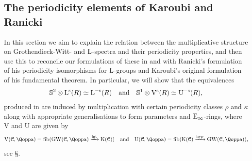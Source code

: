 



















 








\subsection{The periodicity elements of Karoubi and Ranicki}
\label{subsection:PeriodicityviaMultiplication}%


In this section we aim to explain the relation between the multiplicative structure on Grothendieck-Witt- and $\operatorname L$-spectra and their periodicity properties, and then use this to reconcile our formulations of these in \paperone and \papertwo with Ranicki's formulation of his periodicity isomorphisms for $\operatorname L$-groups and Karoubi's original formulation of his fundamental theorem. In particular, we will show that the equivalences
\[
\mathbb S^2 \otimes \operatorname L^{\mathrm{s}}(R) \simeq \operatorname L^{-\mathrm{s}}(R) \quad \text{and} \quad \mathbb S^1 \otimes \mathrm V^{\mathrm{s}}(R) \simeq \mathrm U^{-\mathrm{s}}(R),
\]
produced in \papertwo are induced by multiplication with certain periodicity classes $\rho$ and $\kappa$ along with appropriate generalisations to form parameters and ${\mathrm{E}_{\infty}}$-rings, where %
$\mathrm V$ and $\mathrm U$ are given by
\[
\mathrm V(\C,\QF) = \fib(\GW(\C,\QF) \xrightarrow{\fgt} \K(\C))  \quad \text{and} \quad \mathrm U(\C,\QF) = \fib(\K(\C) \xrightarrow{\hyp} \GW(\C,\QF)),
\]
see \S{}.

